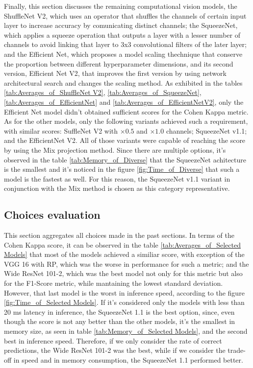 Finally, this section discusses the remaining computational vision models, the ShuffleNet V2, which uses an operator that shuffles the channels of certain input layer to increase accuracy by comunicating distinct channels; the SqueezeNet, which applies a squeeze operation that outputs a layer with a lesser number of channels to avoid linking that layer to 3x3 convolutional filters of the later layer; and the Efficient Net, which proposes a model scaling thechnique that conserve the proportion between different hyperparameter dimensions, and its second version, Efficient Net V2, that improves the first version by using network architectural search and changes the scaling method. As exhibited in the tables \ref{tab:Averages_of_ShuffleNet V2}, \ref{tab:Averages_of_SqueezeNet}, \ref{tab:Averages_of_EfficientNet} and \ref{tab:Averages_of_EfficientNetV2}, only the Efficient Net model didn't obtained sufficient scores for the Cohen Kappa metric. As for the other models, only the following variants achieved such a requirement, with similar scores: SuffleNet V2 with $\times 0.5$ and $\times 1.0$ channels; SqueezeNet v1.1; and the EfficientNet V2. All of those variants were capable of reaching the score by using the \acrshort{Mix} projection method. Since there are multiple options, it's observed in the table \ref{tab:Memory_of_Diverse} that the SqueezeNet achitecture is the smallest and it's noticed in the figure \ref{fig:Time_of_Diverse} that such a model is the fastest as well. For this reason, the SqueezeNet v1.1 variant in conjunction with the \acrshort{Mix} method is chosen as this category representative.






\FloatBarrier

\subsection{Choices evaluation}

This section aggregates all choices made in the past sections. In terms of the Cohen Kappa score, it can be observed in the table \ref{tab:Averages_of_Selected Models} that most of the models achieved a similiar score, with exception of the VGG 16 with \acrshort{RP}, which was the worse in performance for such a metric; and the Wide ResNet 101-2, which was the best model not only for this metric but also for the F1-Score metric, while mantaining the lowest standard deviation. However, that last model is the worst in inference speed, according to the figure \ref{fig:Time_of_Selected Models}. If it's considered only the models with less than 20 ms latency in inference, the SqueezeNet 1.1 is the best option, since, even though the score is not any better than the other models, it's the smallest in memory size, as seen in table \ref{tab:Memory_of_Selected Models}, and the second best in inference speed. Therefore, if we only consider the rate of correct predictions, the Wide ResNet 101-2 was the best, while if we consider the trade-off in speed and in memory consumption, the SqueezeNet 1.1 performed better.

